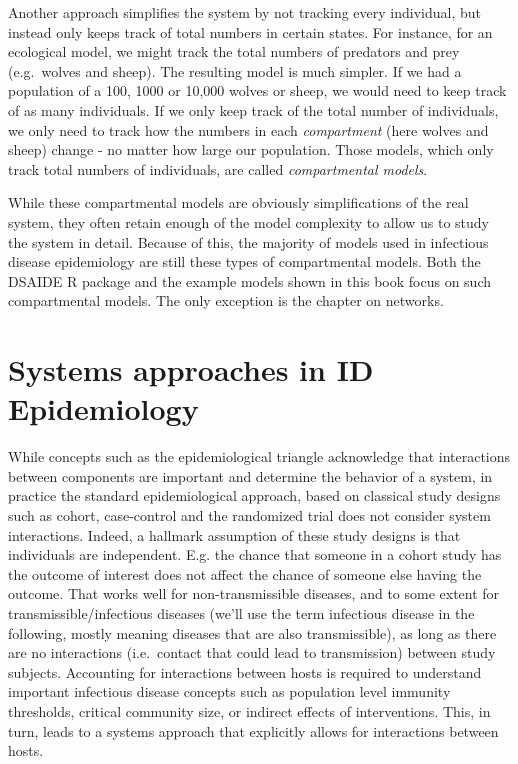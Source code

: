\documentclass[]{book}
\theoremstyle{definition}
\theoremstyle{definition}
\theoremstyle{definition}
\theoremstyle{remark}
\begin{document}
Another approach simplifies the system by not tracking every individual,
but instead only keeps track of total numbers in certain states. For
instance, for an ecological model, we might track the total numbers of
predators and prey (e.g.~wolves and sheep). The resulting model is much
simpler. If we had a population of a 100, 1000 or 10,000 wolves or
sheep, we would need to keep track of as many individuals. If we only
keep track of the total number of individuals, we only need to track how
the numbers in each \emph{compartment} (here wolves and sheep) change -
no matter how large our population. Those models, which only track total
numbers of individuals, are called \emph{compartmental models}.

While these compartmental models are obviously simplifications of the
real system, they often retain enough of the model complexity to allow
us to study the system in detail. Because of this, the majority of
models used in infectious disease epidemiology are still these types of
compartmental models. Both the DSAIDE R package and the example models
shown in this book focus on such compartmental models. The only
exception is the chapter on networks.

\section{Systems approaches in ID
Epidemiology}\label{systems-approaches-in-id-epidemiology}

While concepts such as the epidemiological triangle acknowledge that
interactions between components are important and determine the behavior
of a system, in practice the standard epidemiological approach, based on
classical study designs such as cohort, case-control and the randomized
trial does not consider system interactions. Indeed, a hallmark
assumption of these study designs is that individuals are independent.
E.g. the chance that someone in a cohort study has the outcome of
interest does not affect the chance of someone else having the outcome.
That works well for non-transmissible diseases, and to some extent for
transmissible/infectious diseases (we'll use the term infectious disease
in the following, mostly meaning diseases that are also transmissible),
as long as there are no interactions (i.e.~contact that could lead to
transmission) between study subjects. Accounting for interactions
between hosts is required to understand important infectious disease
concepts such as population level immunity thresholds, critical
community size, or indirect effects of interventions. This, in turn,
leads to a systems approach that explicitly allows for interactions
between hosts.
\end{document}
